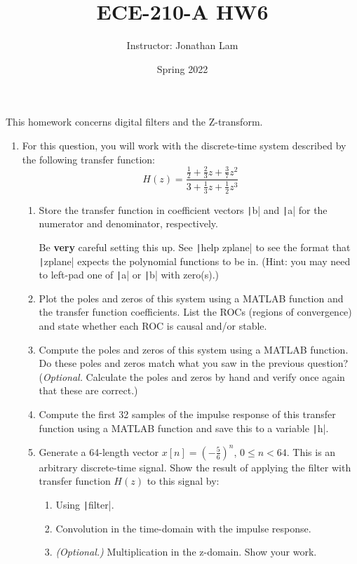 \documentclass{article}
\title{ECE-210-A HW6}
\author{Instructor: Jonathan Lam}
\date{Spring 2022}
\begin{document}
\maketitle

\noindent This homework concerns digital filters and the Z-transform.
\begin{enumerate}
\item For this question, you will work with the discrete-time system described by the following transfer function:
  \begin{equation*}
    H(z)=\frac{\frac{1}{2}+\frac{2}{3}z+\frac{3}{7}z^2}{3+\frac{1}{3}z+\frac{1}{2}z^3}
  \end{equation*}
  \begin{enumerate}
  \item Store the transfer function in coefficient vectors \texttt|b| and \texttt|a| for the numerator and denominator, respectively.

    Be \textbf{very} careful setting this up. See \texttt|help zplane| to see the format that \texttt|zplane| expects the polynomial functions to be in. (Hint: you may need to left-pad one of \texttt|a| or \texttt|b| with zero(s).)

  \item Plot the poles and zeros of this system using a MATLAB function and the transfer function coefficients. List the ROCs (regions of convergence) and state whether each ROC is causal and/or stable.

  \item Compute the poles and zeros of this system using a MATLAB function. Do these poles and zeros match what you saw in the previous question? (\textit{Optional.} Calculate the poles and zeros by hand and verify once again that these are correct.)

  \item Compute the first 32 samples of the impulse response of this transfer function using a MATLAB function and save this to a variable \texttt|h|.

  \item Generate a 64-length vector $x[n]=\left(-\frac{5}{6}\right)^n$, $0\le n<64$. This is an arbitrary discrete-time signal. Show the result of applying the filter with transfer function $H(z)$ to this signal by:
    \begin{enumerate}
    \item Using \texttt|filter|.
    \item Convolution in the time-domain with the impulse response.
    \item \textit{(Optional.)} Multiplication in the z-domain. Show your work.


\end{enumerate}
\end{enumerate}
\end{enumerate}
\end{document}
